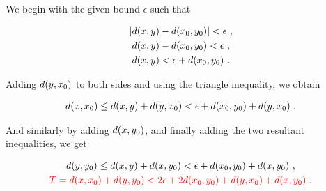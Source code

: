 \begin{frame}
    We begin with the given bound \(\epsilon\) such that

    \begin{gather}
        |d(x, y) - d(x_0, y_0)| < \epsilon~, \nonumber\\
        d(x, y) - d(x_0, y_0) < \epsilon~, \nonumber\\
        d(x, y) < \epsilon + d(x_0, y_0)~.
    \end{gather}

    \pause

    Adding \(d(y, x_0)\) to both sides and using the triangle inequality,
    we obtain

    \begin{gather}
        d(x, x_0) \leq d(x, y) + d(y, x_0) < \epsilon + d(x_0, y_0) + d(y, x_0)~.
    \end{gather}

    \pause

    And similarly by adding \(d(x, y_0)\), and finally adding the two
    resultant inequalities, we get

    \begin{gather}
        d(y, y_0) \leq d(x, y) + d(x, y_0) < \epsilon + d(x_0, y_0) + d(x, y_0)~,\nonumber\\
        \textcolor{red}{T = d(x, x_0) + d(y, y_0) < 2\epsilon + 2d(x_0, y_0) + d(y, x_0)+ d(x, y_0)~.}        
        \label{eqn:tresult}
    \end{gather}


\end{frame}

